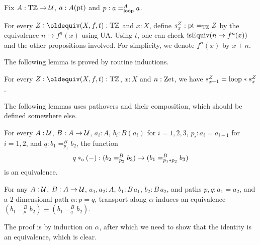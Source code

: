 \documentclass[a4,12pt]{amsart}
\begin{document}
Fix $A:{\mathrm{T}\mathbb{Z}}\to\mathcal{U}$, $a:A({\mathord{\mathrm{pt}}})$ and $p: a=^A_{\mathrm{loop}} a$. 

\begin{definition}\label{def:loop-s-iterated}
For every $Z\defeq(X,f,t):\TorZ$ and $x:X$, 
define $s^Z_x: {\mathord{\mathrm{pt}}} =_{\mathrm{T}\mathbb{Z}} Z$ by the equivalence $n\mapsto f^n(x)$ using UA. 
Using $t$, one can check $\mathrm{isEquiv}(n\mapsto f^n(x))$
and the other propositions involved. 
For simplicity, we denote $f^n(x)$ by $x+n$.
\end{definition}

The following lemma is proved by routine inductions.

\begin{lemma}\label{lem:loop-s-iterated}
  For every $Z\defeq(X,f,t):\TorZ$, $x:X$ and $n:\mathrm{Zet}$, 
  we have $s^Z_{x+1} = \mathrm{loop} * s^Z_x$. 
\end{lemma}

The following lemmas uses pathovers and their composition, 
which should be defined somewhere else. 

\begin{lemma}\label{lem:concat-over}
  For every $A : \mathcal{U}$, $B : A \to \mathcal{U}$, $a_i:A$, $b_i:B(a_i)$ for $i=1,2,3$, $p_i : a_i = a_{i+1}$ for $i=1,2$, and $q : b_1 =^B_{p_1} b_2$, the
  function
  \[
    q *_{\mathrm{o}} ({-}) : (b_2 =^B_{p_2} b_3) \to (b_1 =^B_{p_1* p_2} b_3)
  \]
  is an equivalence.
\end{lemma}
\begin{lemma}\label{lem:pathover-change-path}
  For any $A : \mathcal{U}$, $B : A \to \mathcal{U}$, $a_1,a_2 : A$, $b_1 : B\,a_1$, $b_2: B\,a_2$,
  and paths $p,q:a_1=a_2$, and a $2$-dimensional path $\alpha : p = q$,
  transport along $\alpha$
  induces an equivalence $(b_1 =^B_p b_2) \equiv (b_1 =^B_q b_2)$.
\end{lemma}
The proof is by induction on $\alpha$, after which we need to show that the identity is an equivalence, which is clear.
\end{document}
